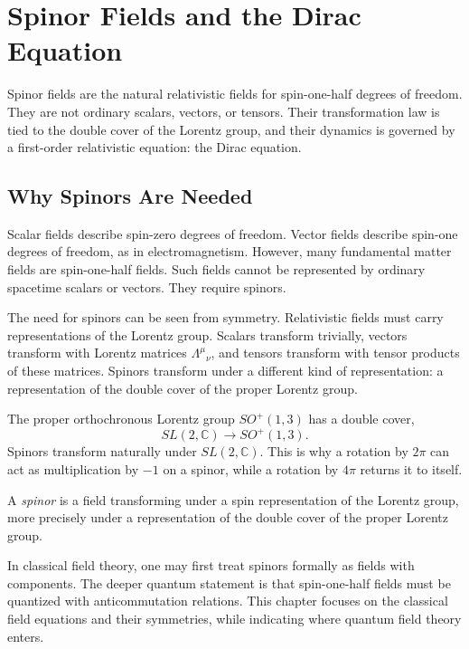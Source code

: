 \chapter{Spinor Fields and the Dirac Equation}

\begin{remarkbox}
Spinor fields are the natural relativistic fields for spin-one-half degrees of
freedom. They are not ordinary scalars, vectors, or tensors. Their transformation
law is tied to the double cover of the Lorentz group, and their dynamics is
governed by a first-order relativistic equation: the Dirac equation.
\end{remarkbox}

\section{Why Spinors Are Needed}

Scalar fields describe spin-zero degrees of freedom. Vector fields describe
spin-one degrees of freedom, as in electromagnetism. However, many fundamental
matter fields are spin-one-half fields. Such fields cannot be represented by
ordinary spacetime scalars or vectors. They require spinors.

The need for spinors can be seen from symmetry. Relativistic fields must carry
representations of the Lorentz group. Scalars transform trivially, vectors
transform with Lorentz matrices \(\Lambda^\mu{}_{\nu}\), and tensors transform
with tensor products of these matrices. Spinors transform under a different kind
of representation: a representation of the double cover of the proper Lorentz
group.

The proper orthochronous Lorentz group \(SO^+(1,3)\) has a double cover,
\[
    SL(2,\mathbb{C})\longrightarrow SO^+(1,3).
\]
Spinors transform naturally under \(SL(2,\mathbb{C})\). This is why a rotation by
\(2\pi\) can act as multiplication by \(-1\) on a spinor, while a rotation by
\(4\pi\) returns it to itself.

\begin{definitionbox}
A \emph{spinor} is a field transforming under a spin representation of the
Lorentz group, more precisely under a representation of the double cover of the
proper Lorentz group.
\end{definitionbox}

In classical field theory, one may first treat spinors formally as fields with
components. The deeper quantum statement is that spin-one-half fields must be
quantized with anticommutation relations. This chapter focuses on the classical
field equations and their symmetries, while indicating where quantum field
theory enters.

